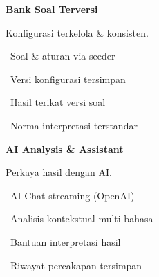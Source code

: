 \documentclass[a4paper]{article}
\begin{document}
\noindent
\begin{minipage}[t]{0.485\textwidth}
    \colorbox{OrangePrimary}{%
        \begin{minipage}{\dimexpr\textwidth-2\fboxsep\relax}
            {\fontsize{10}{13}\selectfont\bfseries\color{White} Bank Soal Terversi}
        \end{minipage}}\par
    \vspace{4pt}
    {\fontsize{9}{12}\selectfont\color{TextDark}%
    Konfigurasi terkelola \& konsisten.\par\vspace{3pt}
    \textbullet\ Soal \& aturan via seeder\par\vspace{2pt}%
    \textbullet\ Versi konfigurasi tersimpan\par\vspace{2pt}%
    \textbullet\ Hasil terikat versi soal\par\vspace{2pt}%
    \textbullet\ Norma interpretasi terstandar}%

\end{minipage}%
\hfill
\begin{minipage}[t]{0.485\textwidth}
    \colorbox{EmeraldDark}{%
        \begin{minipage}{\dimexpr\textwidth-2\fboxsep\relax}
            {\fontsize{10}{13}\selectfont\bfseries\color{White} AI Analysis \& Assistant}
        \end{minipage}}\par
    \vspace{4pt}
    {\fontsize{9}{12}\selectfont\color{TextDark}%
    Perkaya hasil dengan AI.\par\vspace{3pt}
    \textbullet\ AI Chat streaming (OpenAI)\par\vspace{2pt}%
    \textbullet\ Analisis kontekstual multi-bahasa\par\vspace{2pt}%
    \textbullet\ Bantuan interpretasi hasil\par\vspace{2pt}%
    \textbullet\ Riwayat percakapan tersimpan}%

\end{minipage}

\vspace{8pt}
\end{document}
